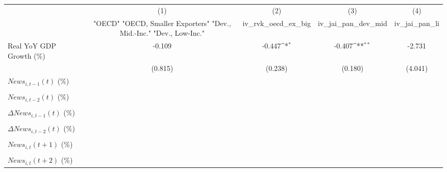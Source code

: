 {
\def\sym#1{\ifmmode^{#1}\else\(^{#1}\)\fi}
\begin{tabular}{l*{4}{c}}
\toprule
                    &\multicolumn{1}{c}{(1)}&\multicolumn{1}{c}{(2)}&\multicolumn{1}{c}{(3)}&\multicolumn{1}{c}{(4)}\\
                    &\multicolumn{1}{c}{ "OECD" "OECD, Smaller Exporters" "Dev., Mid.-Inc." "Dev., Low-Inc."}&\multicolumn{1}{c}{iv_rvk_oecd_ex_big}&\multicolumn{1}{c}{iv_jai_pan_dev_mid}&\multicolumn{1}{c}{iv_jai_pan_li}\\
\midrule
Real YoY GDP Growth (\%)&      -0.109         &      -0.447\sym{*}  &      -0.407\sym{**} &      -2.731         \\
                    &     (0.815)         &     (0.238)         &     (0.180)         &     (4.041)         \\
\addlinespace
$ News_{i,t-1}(t)$ (\%)&                     &                     &                     &                     \\
                    &                     &                     &                     &                     \\
\addlinespace
$ News_{i,t-2}(t)$ (\%)&                     &                     &                     &                     \\
                    &                     &                     &                     &                     \\
\addlinespace
$ \Delta News_{i,t-1}(t)$ (\%)&                     &                     &                     &                     \\
                    &                     &                     &                     &                     \\
\addlinespace
$ \Delta News_{i,t-2}(t)$ (\%)&                     &                     &                     &                     \\
                    &                     &                     &                     &                     \\
\addlinespace
$ News_{i,t}(t+1)$ (\%)&                     &                     &                     &                     \\
                    &                     &                     &                     &                     \\
\addlinespace
$ News_{i,t}(t+2)$ (\%)&                     &                     &                     &                     \\

\end{tabular}}
